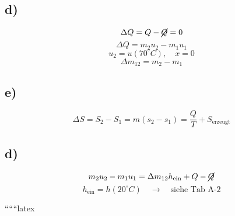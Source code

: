 \subsection*{d)}
\[
\Delta Q = Q - \cancel{Q} = 0
\]
\[
\Delta Q = m_2 u_2 - m_1 u_1
\]
\[
u_2 = u \left(70^\circ C\right), \quad x = 0
\]
\[
\Delta m_{12} = m_2 - m_1
\]

\subsection*{e)}
\[
\Delta S = S_2 - S_1 = m (s_2 - s_1) = \frac{Q}{T} + S_{\text{erzeugt}}
\]

\subsection*{d)}
\[
m_2 u_2 - m_1 u_1 = \Delta m_{12} h_{\text{ein}} + Q - \cancel{Q}
\]
\[
h_{\text{ein}} = h \left(20^\circ C\right) \quad \rightarrow \quad \text{siehe Tab A-2}
\]

``````latex


